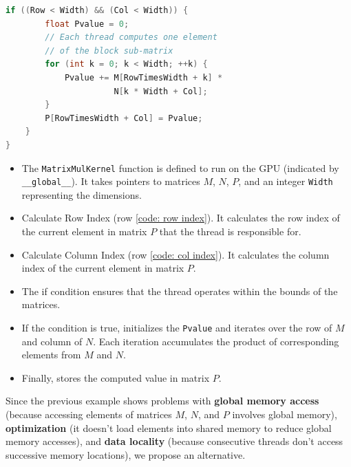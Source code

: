 \begin{examplebox}
\begin{lstlisting}[language=C++]
    if ((Row < Width) && (Col < Width)) {
        float Pvalue = 0;
        // Each thread computes one element
        // of the block sub-matrix
        for (int k = 0; k < Width; ++k) {
            Pvalue += M[RowTimesWidth + k] * 
                      N[k * Width + Col];
        }
        P[RowTimesWidth + Col] = Pvalue;
    }
}\end{lstlisting}
    \begin{itemize}
        \item The \texttt{MatrixMulKernel} function is defined to run on the GPU (indicated by \texttt{\_\_global\_\_}). It takes pointers to matrices $M$, $N$, $P$, and an integer \texttt{Width} representing the dimensions.

        \item Calculate Row Index (row \ref{code: row index}). It calculates the row index of the current element in matrix $P$ that the thread is responsible for.

        \item Calculate Column Index (row \ref{code: col index}). It calculates the column index of the current element in matrix $P$.
        
        \item The if condition ensures that the thread operates within the bounds of the matrices.
        
        \item If the condition is true, initializes the \texttt{Pvalue} and iterates over the row of $M$ and column of $N$. Each iteration accumulates the product of corresponding elements from $M$ and $N$.
        
        \item Finally, stores the computed value in matrix $P$.
    \end{itemize}
\end{examplebox}

\noindent
Since the previous example shows problems with \textbf{global memory access} (because accessing elements of matrices $M$, $N$, and $P$ involves global memory), \textbf{optimization} (it doesn't load elements into shared memory to reduce global memory accesses), and \textbf{data locality} (because consecutive threads don't access successive memory locations), we propose an alternative.

